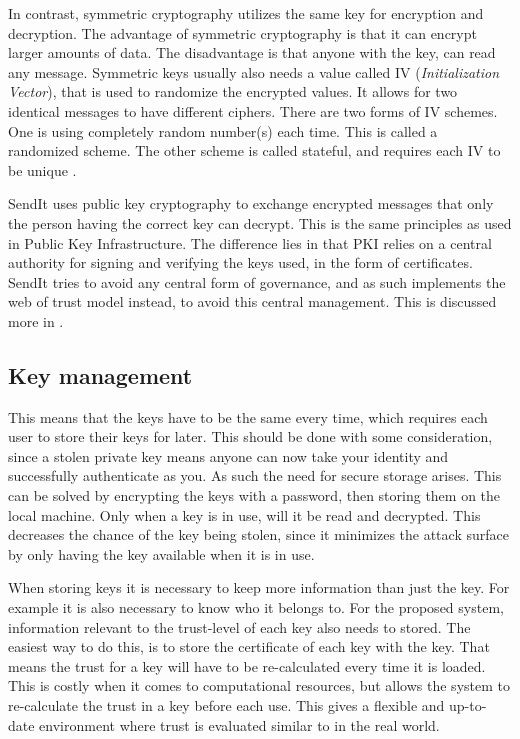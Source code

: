     In contrast, symmetric cryptography utilizes the same key for encryption and decryption. The advantage of symmetric cryptography is that it can encrypt larger amounts of data. The disadvantage is that anyone with the key, can read any message. Symmetric keys usually also needs a value called IV (\emph{Initialization Vector}), that is used to randomize the encrypted values. It allows for two identical messages to have different ciphers. There are two forms of IV schemes. One is using completely random number(s) each time. This is called a randomized scheme. The other scheme is called stateful, and requires each IV to be unique \cite{bellareIntroductionModernCryptography2005}.

    SendIt uses public key cryptography to exchange encrypted messages that only the person having the correct key can decrypt. This is the same principles as used in Public Key Infrastructure. The difference lies in that PKI relies on a central authority for signing and verifying the keys used, in the form of certificates. SendIt tries to avoid any central form of governance, and as such implements the web of trust model instead, to avoid this central management. This is discussed more in .

    \subsection{Key management}
    This means that the keys have to be the same every time, which requires each user to store their keys for later. This should be done with some consideration, since a stolen private key means anyone can now take your identity and successfully authenticate as you. As such the need for secure storage arises. This can be solved by encrypting the keys with a password, then storing them on the local machine. Only when a key is in use, will it be read and decrypted. This decreases the chance of the key being stolen, since it minimizes the attack surface by only having the key available when it is in use.

    When storing keys it is necessary to keep more information than just the key. For example it is also necessary to know who it belongs to. For the proposed system, information relevant to the trust-level of each key also needs to stored. The easiest way to do this, is to store the certificate of each key with the key. That means the trust for a key will have to be re-calculated every time it is loaded. This is costly when it comes to computational resources, but allows the system to re-calculate the trust  in a key before each use. This gives a flexible and up-to-date environment where trust is evaluated similar to in the real world.

